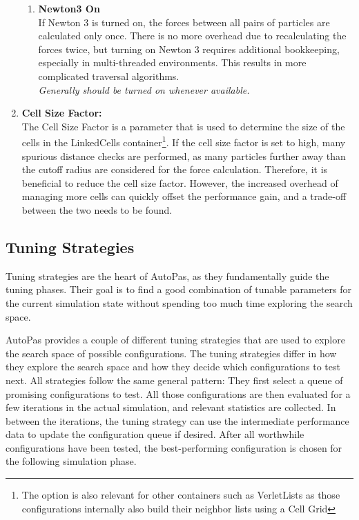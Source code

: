 \begin{enumerate}[label=\textbf{\arabic*.}]
\begin{enumerate}
                  \item \textbf{Newton3 On} \\
                        If Newton 3 is turned on, the forces between all pairs of particles are calculated only once. There is no more overhead due to recalculating the forces twice, but turning on Newton 3 requires additional bookkeeping, especially in multi-threaded environments. This results in more complicated traversal algorithms.\\
                        \textit{Generally should be turned on whenever available.}
            \end{enumerate}

      \item \textbf{Cell Size Factor:} \\
            The Cell Size Factor is a parameter that is used to determine the size of the cells in the LinkedCells container\footnote{The option is also relevant for other containers such as VerletLists as those configurations internally also build their neighbor lists using a Cell Grid}. If the cell size factor is set to high, many spurious distance checks are performed, as many particles further away than the cutoff radius are considered for the force calculation. Therefore, it is beneficial to reduce the cell size factor. However, the increased overhead of managing more cells can quickly offset the performance gain, and a trade-off between the two needs to be found.\\

\end{enumerate}

\subsection{Tuning Strategies}

Tuning strategies are the heart of AutoPas, as they fundamentally guide the tuning phases. Their goal is to find a good combination of tunable parameters for the current simulation state without spending too much time exploring the search space.

AutoPas provides a couple of different tuning strategies that are used to explore the search space of possible configurations. The tuning strategies differ in how they explore the search space and how they decide which configurations to test next. All strategies follow the same general pattern: They first select a queue of promising configurations to test. All those configurations are then evaluated for a few iterations in the actual simulation, and relevant statistics are collected. In between the iterations, the tuning strategy can use the intermediate performance data to update the configuration queue if desired. After all worthwhile configurations have been tested, the best-performing configuration is chosen for the following simulation phase.


